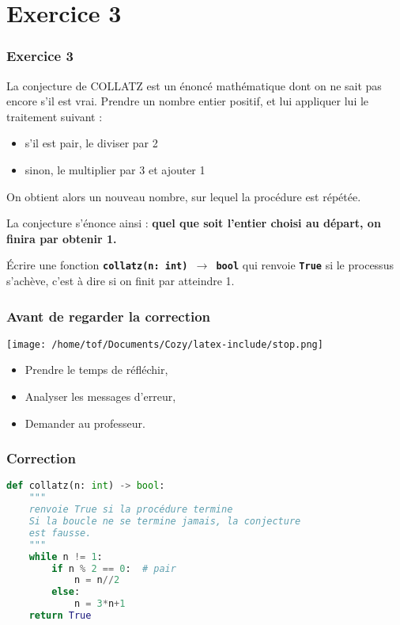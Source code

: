 \documentclass[svgnames,11pt]{beamer}
\begin{document}
\section{Exercice 3}
\begin{frame}
    \frametitle{Exercice 3}

    La conjecture de COLLATZ est un énoncé mathématique dont on ne sait pas encore s’il est vrai. Prendre un nombre entier positif, et lui appliquer lui le traitement suivant :
    \begin{itemize}
        \item s’il est pair, le diviser par 2        
        \item sinon, le multiplier par 3 et ajouter 1
    \end{itemize}    
    On obtient alors un nouveau nombre, sur lequel la procédure est répétée. \begin{center}
        La conjecture s’énonce ainsi : \textbf{quel que soit l’entier choisi au départ, on finira par obtenir 1.}    
    \end{center}
    Écrire une fonction \texttt{\textbf{collatz(n: int) $\rightarrow$ bool}} qui renvoie \texttt{\textbf{True}} si le processus s'achève, c'est à dire si on finit par atteindre 1.

\end{frame}
\begin{frame}
    \frametitle{Avant de regarder la correction}
\begin{center}
    \centering
    \texttt{[image: /home/tof/Documents/Cozy/latex-include/stop.png]}
    \end{center}
{\Large
    \begin{itemize}
        \item Prendre le temps de réfléchir,
        \item Analyser les messages d'erreur,
        \item Demander au professeur.
    \end{itemize}
}
\end{frame}
\begin{frame}[fragile]
    \frametitle{Correction}

\begin{lstlisting}[language=Python , basicstyle=\ttfamily\small, xleftmargin=2em, xrightmargin=2em]
def collatz(n: int) -> bool:
    """
    renvoie True si la procédure termine
    Si la boucle ne se termine jamais, la conjecture
    est fausse.
    """
    while n != 1:
        if n % 2 == 0:  # pair
            n = n//2
        else:
            n = 3*n+1
    return True
\end{lstlisting}

\end{frame}
\end{document}

